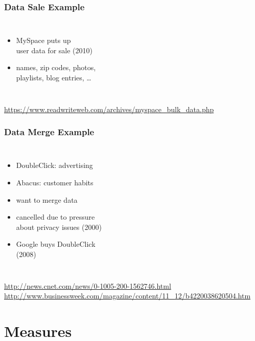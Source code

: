 \documentclass[dvipsnames]{beamer}
\theoremstyle{plain}
\begin{document}
\begin{frame}
  \frametitle{Data Sale Example}

  \begin{columns}

    \begin{itemize}
      \item MySpace puts up\\
        user data for sale (2010)
      \item names, zip codes, photos,\\
        playlists, blog entries, \ldots
    \end{itemize}
  \end{columns}

  \medskip
  \tiny{\url{https://www.readwriteweb.com/archives/myspace_bulk_data.php}}\\
\end{frame}

\begin{frame}
  \frametitle{Data Merge Example}

  \begin{columns}

    \begin{itemize}
      \item DoubleClick: advertising
      \item Abacus: customer habits
      \item want to merge data
      \item cancelled due to pressure\\
        about privacy issues (2000)

      \pause
      \medskip
      \item Google buys DoubleClick\\
        (2008)
    \end{itemize}
  \end{columns}

  \medskip
  \tiny{\url{http://news.cnet.com/news/0-1005-200-1562746.html}}\\
  \smallskip
  \tiny{\url{http://www.businessweek.com/magazine/content/11_12/b4220038620504.htm}}\\
\end{frame}

\section{Measures}
\end{document}
